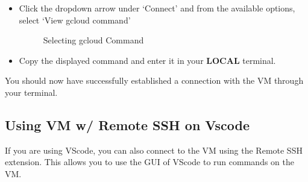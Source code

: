 \documentclass[12pt]{article}
\begin{document}
\begin{itemize}
	\item
	Click the dropdown arrow under `Connect' and from the available options, select `View gcloud command'
	\begin{figure}[h]
    	\centering
    		\caption{Selecting gcloud Command}
	\end{figure}
	
	\item
	Copy the displayed command and enter it in your \textbf{LOCAL} terminal.
\end{itemize}

You should now have successfully established a connection with the VM through your terminal.

\subsection{Using VM w/ Remote SSH on Vscode}
If you are using VScode, you can also connect to the VM using the Remote SSH extension. This allows you to use the GUI of VScode to run commands on the VM.\\
\end{document}
